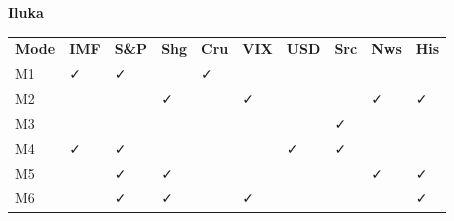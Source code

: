 \textbf{Iluka}



{\def\LTcaptype{none} %

\begin{longtable}[]{@{}

  >{\raggedright\arraybackslash}p{}

  >{\raggedright\arraybackslash}p{}

  >{\raggedright\arraybackslash}p{}

  >{\raggedright\arraybackslash}p{}

  >{\raggedright\arraybackslash}p{}

  >{\raggedright\arraybackslash}p{}

  >{\raggedright\arraybackslash}p{}

  >{\raggedright\arraybackslash}p{}

  >{\raggedright\arraybackslash}p{}

  >{\raggedright\arraybackslash}p{}@{}}

\toprule\noalign{}

\endhead

\bottomrule\noalign{}

\endlastfoot

\textbf{Mode} & \textbf{IMF} & \textbf{S\&P} & \textbf{Shg} &

\textbf{Cru} & \textbf{VIX} & \textbf{USD} & \textbf{Src} & \textbf{Nws}

& \textbf{His} \\

M1 & ✓ & ✓ & & ✓ & & & & & \\

M2 & & & ✓ & & ✓ & & & ✓ & ✓ \\

M3 & & & & & & & ✓ & & \\

M4 & ✓ & ✓ & & & & ✓ & ✓ & & \\

M5 & & ✓ & ✓ & & & & & ✓ & ✓ \\

M6 & & ✓ & ✓ & & ✓ & & & & ✓ \\

\end{longtable}

}



